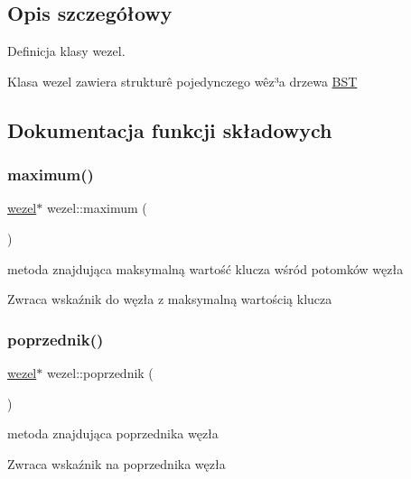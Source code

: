\subsection{Opis szczegółowy}
Definicja klasy wezel. 

Klasa wezel zawiera strukturê pojedynczego wêz³a drzewa \mbox{\hyperlink{class_b_s_t}{B\+ST}} 

\subsection{Dokumentacja funkcji składowych}
\mbox{\label{classwezel_a80ba6462ff084575ec6ceff70328b309}} 
\subsubsection{\texorpdfstring{maximum()}{maximum()}}
{\footnotesize\ttfamily \mbox{\hyperlink{classwezel}{wezel}}$\ast$ wezel\+::maximum (\begin{DoxyParamCaption}{ }\end{DoxyParamCaption})\hspace{0.3cm}{\ttfamily [inline]}}



metoda znajdująca maksymalną wartość klucza wśród potomków węzła 

\begin{DoxyReturn}{Zwraca}
wskaźnik do węzła z maksymalną wartością klucza 
\end{DoxyReturn}
\mbox{\label{classwezel_a9f30c6f8458f88551aa2ac1594b71055}} 
\subsubsection{\texorpdfstring{poprzednik()}{poprzednik()}}
{\footnotesize\ttfamily \mbox{\hyperlink{classwezel}{wezel}}$\ast$ wezel\+::poprzednik (\begin{DoxyParamCaption}{ }\end{DoxyParamCaption})\hspace{0.3cm}{\ttfamily [inline]}}



metoda znajdująca poprzednika węzła 

\begin{DoxyReturn}{Zwraca}
wskaźnik na poprzednika węzła 
\end{DoxyReturn}


